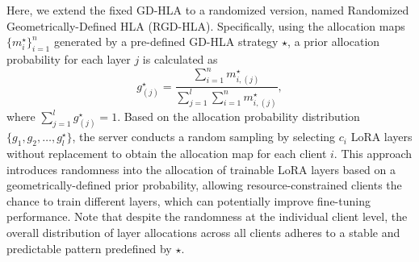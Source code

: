 \documentclass[lettersize,journal]{IEEEtran}
\newcommand{\ping}[1]{\textcolor{magenta}{#1}}
\begin{document}
Here, we extend the fixed GD-HLA to a randomized version, named Randomized Geometrically-Defined HLA (RGD-HLA).
Specifically, using the allocation maps $\{m_i^\star\}_{i=1}^n$ generated by a pre-defined GD-HLA strategy $\star$, a prior allocation probability for each layer $j$ is calculated as 
\begin{equation}\label{eqn:dpp-HLA1}
g_{(j)}^{\star} = \frac{\sum_{i=1}^{n} m_{i,(j)}^{\star}}{\sum_{j=1}^l \sum_{i=1}^{n} {m_{i, (j)}^{\star}}},
\end{equation}
where $\sum_{j=1}^l g_{(j)}^{\star} =1$. 
{
Based on the allocation probability distribution $\{g_1, g_2, \dots, g_l^{\star}\}$, the server conducts a random sampling by selecting $c_i$ LoRA layers without replacement to obtain the allocation map for each client $i$.} This approach introduces randomness into the allocation of trainable LoRA layers based on a geometrically-defined prior probability, allowing resource-constrained clients the chance to train different layers, which can potentially improve fine-tuning performance. Note that despite the randomness at the individual client level, the overall distribution of layer allocations across all clients adheres to a stable and predictable pattern predefined by $\star$.

\end{document}
